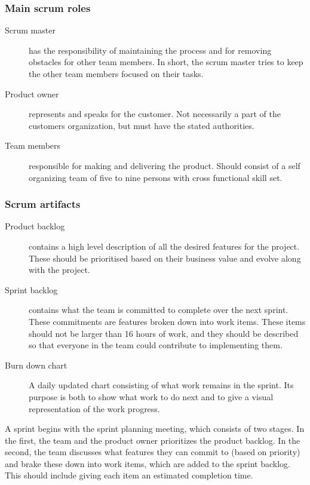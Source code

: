 \subsubsection{Main scrum roles}
\begin{description}
	\item[Scrum master] has the responsibility of maintaining the process and
		for removing obstacles for other team members. In short, the scrum
		master tries to keep the other team members focused on their tasks.
	\item[Product owner] represents and speaks for the customer. Not
		necessarily a part of the customers organization, but must have the
		stated authorities.
	\item[Team members] responsible for making and delivering the product.
		Should consist of a self organizing team of five to nine persons with
		cross functional skill set.
\end{description}

\subsubsection{Scrum artifacts}
\begin{description}
	\item[Product backlog] contains a high level description of all the desired
		features for the project. These should be prioritised based on their
		business value and evolve along with the project.
	\item[Sprint backlog] contains what the team is committed to complete over
		the next sprint. These commitments are features broken down into work
		items. These items should not be larger than 16 hours of work, and they
		should be described so that everyone in the team could contribute to
		implementing them.
	\item[Burn down chart] A daily updated chart consisting of what work
		remains in the sprint. Its purpose is both to show what work to do next
		and to give a visual representation of the work progress.
\end{description}

A sprint begins with the sprint planning meeting, which consists of two
stages. In the first, the team and the product owner prioritizes the product
backlog. In the second, the team discusses what features they can commit to
(based on priority) and brake these down into work items, which are added to
the sprint backlog. This should include giving each item an estimated
completion time.

